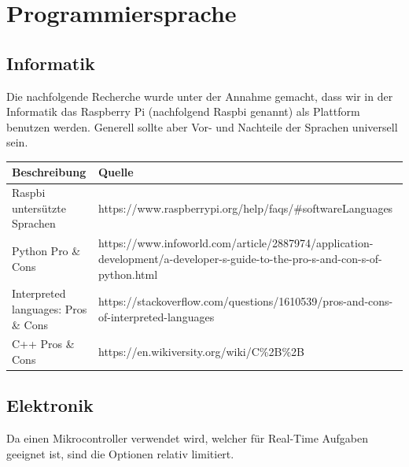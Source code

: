 \documentclass[a4paper]{report}
\begin{document}
\section{Programmiersprache}


\subsection{Informatik}
Die nachfolgende Recherche wurde unter der Annahme gemacht, dass wir in der Informatik das Raspberry Pi (nachfolgend Raspbi genannt) als Plattform benutzen werden. Generell sollte aber Vor- und Nachteile der Sprachen universell sein.

\vspace{1em}
\noindent
\begin{tabular}{|p{}|p{}|}
	\hline
	\textbf{Beschreibung} & \textbf{Quelle} \\
	\hline
	Raspbi untersützte Sprachen& https://www.raspberrypi.org/help/faqs/\#softwareLanguages \\
	\hline
	Python Pro \& Cons & https://www.infoworld.com/article/2887974/application-development/a-developer-s-guide-to-the-pro-s-and-con-s-of-python.html \\
	\hline
	Interpreted languages: Pros \& Cons & https://stackoverflow.com/questions/1610539/pros-and-cons-of-interpreted-languages\\
	\hline
	C++ Pros \& Cons & https://en.wikiversity.org/wiki/C\%2B\%2B\\
	\hline
\end{tabular}

\subsection{Elektronik}
Da einen Mikrocontroller verwendet wird, welcher für Real-Time Aufgaben
geeignet ist, sind die Optionen relativ limitiert.
\end{document}

